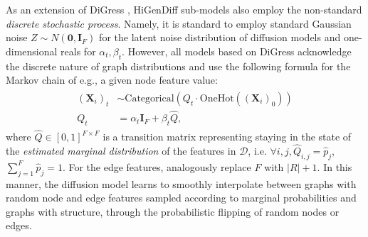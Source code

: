 As an extension of DiGress \cite{vignac_digress_2022}, HiGenDiff sub-models also employ the non-standard \emph{discrete stochastic process}. Namely, it is standard to employ standard Gaussian noise $Z\sim N(\mathbf{0},\mathbf{I}_F)$ for the latent noise distribution of diffusion models and one-dimensional reals for $\alpha_t,\beta_t$. However, all models based on DiGress acknowledge the discrete nature of graph distributions and use the following formula for the Markov chain of e.g., a given node feature value:
\begin{align}
\begin{split}
    (\mathbf{X}_i)_t &\sim \text{Categorical}(Q_t \cdot \text{OneHot}((\mathbf{X}_i)_0)) \\
    Q_t &= \alpha_t \mathbf{I}_F + \beta_t \hat{Q},
\end{split}
\end{align}
where $\hat{Q} \in [0,1]^{F \times F}$ is a transition matrix representing staying in the state of the \emph{estimated marginal distribution} of the features in $\mathcal{D}$, i.e. $\forall i,j,\hat{Q}_{i,j} = \hat{p}_j$, $\sum_{j=1}^{F}{\hat{p}_j}=1$. For the edge features, analogously replace $F$ with $|R|+1$. In this manner, the diffusion model learns to smoothly interpolate between graphs with random node and edge features sampled according to marginal probabilities and graphs with structure, through the probabilistic flipping of random nodes or edges.

